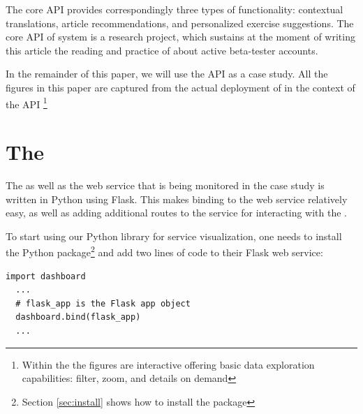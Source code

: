 \documentclass[conference]{IEEEtran}
\begin{document}
  The core API provides correspondingly three types of functionality: contextual translations, article recommendations, and personalized exercise suggestions. The core API of system is a research project, which sustains at the moment of writing this article the reading and practice of about \activeUserCount active beta-tester accounts. 

  In the remainder of this paper, we will use the \zee API as a case study. All the figures in this paper are captured from the actual deployment of \tool in the context of the \zee API \footnote{Within the \tool the figures are interactive offering basic data exploration capabilities: filter, zoom, and details on demand\cite{Shne99a}}





\section{The \tool}

  The \tool as well as the web service that is being monitored in the case study is written in Python using Flask. This makes binding to the web service relatively easy, as well as adding additional routes to the service for interacting with the \tool.

  To start using our Python library for service visualization, one needs to install the Python package\footnote{Section \ref{sec:install} shows how to install the package} 
  and add two lines of code to their Flask web service:

  \begin{lstlisting}[style=custompython]
  import dashboard
  ...
  # flask_app is the Flask app object
  dashboard.bind(flask_app)
  ...
  \end{lstlisting}


\end{document}
